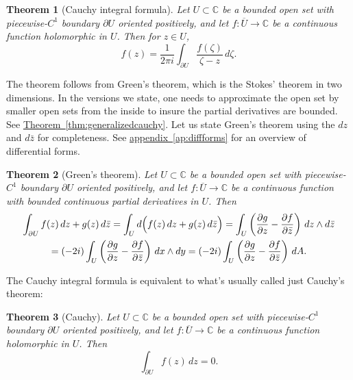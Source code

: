 \documentclass[12pt,openany]{book}
\newcommand{\C}{{\mathbb{C}}}
\theoremstyle{plain}
\newtheorem{thm}{Theorem}[section]
\theoremstyle{remark}
\theoremstyle{definition}
\theoremstyle{exercise}
\theoremstyle{example}
\newcommand{\appendixref}[1]{\hyperref[#1]{appendix~\ref*{#1}}}
\newcommand{\thmref}[1]{\hyperref[#1]{Theorem~\ref*{#1}}}
\begin{document}
\begin{thm}[Cauchy integral formula]
Let $U \subset \C$ be a bounded open set with piecewise-$C^1$ boundary
$\partial U$ oriented positively, and let
$f \colon \overline{U} \to \C$ be a continuous function
holomorphic in $U$.
Then for $z \in U$,
\begin{equation*}
f(z) =
\frac{1}{2\pi i}
\int_{\partial U}
\frac{f(\zeta)}{\zeta-z}
\,
d \zeta .
\end{equation*}
\end{thm}

The theorem follows from Green's theorem, which is the Stokes' theorem
in two dimensions.  In the versions we state, one needs to
approximate the open set by smaller open sets from the inside to insure
the partial derivatives are bounded.  See
\thmref{thm:generalizedcauchy}.  Let us state Green's theorem using
the $dz$ and $d\bar{z}$ for completeness.  See \appendixref{ap:diffforms}
for an overview of differential forms.

\begin{thm}[Green's theorem] \label{thm:greens}
Let $U \subset \C$ be a bounded open set with piecewise-$C^1$ boundary
$\partial U$ oriented positively, and let
$f \colon \overline{U} \to \C$ be a continuous function
with bounded continuous partial derivatives in $U$.
Then
\begin{multline*}
\int_{\partial U} f(z) \, dz + g(z) \, d\bar{z}
=
\int_{U} d \Bigl( f(z) \, dz + g(z) \, d\bar{z} \Bigr)
=
\int_{U}
\left(
\frac{\partial g}{\partial z}
-
\frac{\partial f}{\partial \bar{z}}
\right)
\, dz \wedge d\bar{z}
\\
=
(-2i)
\int_{U}
\left(
\frac{\partial g}{\partial z}
-
\frac{\partial f}{\partial \bar{z}}
\right)
\, dx \wedge dy 
=
(-2i)
\int_{U}
\left(
\frac{\partial g}{\partial z}
-
\frac{\partial f}{\partial \bar{z}}
\right)
\, dA.
\end{multline*}
\end{thm}

The Cauchy integral formula is equivalent to
what's usually called just Cauchy's theorem:

\begin{thm}[Cauchy]
Let $U \subset \C$ be a bounded open set with piecewise-$C^1$ boundary
$\partial U$ oriented positively, and let
$f \colon \overline{U} \to \C$ be a continuous function
holomorphic in $U$.  Then
\begin{equation*}
\int_{\partial U}
f(z) \, dz = 0 .
\end{equation*}
\end{thm}
\end{document}
